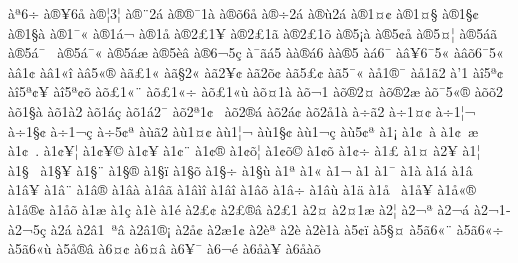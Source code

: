 {^^e0^^aa6^^ad^^f7
^^e0^^ae^^a56^^e5
^^e0^^ae^^a63^^a6
^^e0^^ae^^a82^^e1
^^e0^^ae^^ae^^af1^^e0
^^e0^^ae^^f56^^e5
^^e0^^ae^^f72^^e1
^^e0^^ae^^f92^^e1
^^e0^^ae1^^a4^^a2
^^e0^^ae1^^a4^^a7
^^e0^^ae1^^a7^^a2
^^e0^^ae1^^a7^^e0
^^e0^^ae1^^af^^ab
^^e0^^ae1^^e1^^ac
^^e0^^ae1^^e5
^^e0^^ae2^^a31^^ad^^a5
^^e0^^ae2^^a31^^ad^^e3
^^e0^^ae2^^a31^^ad^^f5
^^e0^^ae5^^a1^^e0
^^e0^^ae5^^a2^^e5
^^e0^^ae5^^a4^^a6
^^e0^^ae5^^e1^^ad^^e3
^^e0^^ae5^^e1^^af^^a0
^^e0^^ae5^^e1^^af^^ab
^^e0^^ae5^^e1^^e6
^^e0^^ae5^^e8^^e2
^^e0^^ae6^^ac5^^e7
^^e0^^af^^e3^^e15
^^e0^^e0^^ae^^e16
^^e0^^e0^^ae5
^^e0^^e16^^af
^^e0^^e2^^a56^^af5^^ab
^^e0^^e2^^f56^^af5^^ab
^^e0^^e21^^a2
^^e0^^e21^^ab^^ee
^^e0^^e25^^ab^^ae
^^e0^^e3^^a31^^ab
^^e0^^e3^^a72^^ab
^^e0^^e32^^a5^^a2
^^e0^^e32^^f5^^a2
^^e0^^e35^^a3^^a2
^^e0^^e35^^af^^ab
^^e0^^e51^^ae^^af
^^e0^^e51^^e32
^^e0'1
^^e0^^ee5^^aa^^a2^^a0
^^e0^^ee5^^aa^^a2^^a5
^^e0^^ee5^^aa^^a2^^f5
^^e0^^f5^^a31^^ab^^a8
^^e0^^f5^^a31^^ab^^f7
^^e0^^f5^^a31^^ab^^f9
^^e0^^f5^^a41^^e0
^^e0^^f5^^ac1^^ad
^^e0^^f5^^ae2^^a4
^^e0^^f5^^ae2^^e6
^^e0^^f5^^af5^^ab^^ae
^^e0^^f5^^f52
^^e0^^f51^^a7^^e0
^^e0^^f51^^e02
^^e0^^f51^^e1^^e7
^^e0^^f51^^e12^^af
^^e0^^f52^^aa1^^a2^^a0
^^e0^^f52^^ae^^e1
^^e0^^f52^^e1^^a2
^^e0^^f52^^e51^^e0
^^e0^^f7^^e32
^^e0^^f71^^a4^^a2
^^e0^^f71^^a6^^ac
^^e0^^f71^^a7^^a2
^^e0^^f71^^ac^^e7
^^e0^^f75^^a2^^aa
^^e0^^f9^^e32
^^e0^^f91^^a4^^a2
^^e0^^f91^^a6^^ac
^^e0^^f91^^a7^^a2
^^e0^^f91^^ac^^e7
^^e0^^f95^^a2^^aa
^^e01^^a1
^^e01^^a2^^a0^^e0
^^e01^^a2^^a0^^e6
^^e01^^a2^^a0.
^^e01^^a2^^a5^^a6
^^e01^^a2^^a5^^a9
^^e01^^a2^^a5^^ad
^^e01^^a2^^a8
^^e01^^a2^^ae
^^e01^^a2^^f5^^a6
^^e01^^a2^^f5^^a9
^^e01^^a2^^f5^^ad
^^e01^^a2^^f7
^^e01^^a3
^^e01^^a4
^^e02^^a5
^^e01^^a6
^^e01^^a7^^a0
^^e01^^a7^^a5
^^e01^^a7^^a8
^^e01^^a7^^ae
^^e01^^a7^^ef
^^e01^^a7^^f5
^^e01^^a7^^f7
^^e01^^a7^^f9
^^e01^^aa
^^e01^^ab
^^e01^^ac
^^e01^^ad
^^e01^^af
^^e01^^e0
^^e01^^e1
^^e01^^e2^^a0
^^e01^^e2^^a5
^^e01^^e2^^a8
^^e01^^e2^^ae
^^e01^^e2^^e0
^^e01^^e2^^e3
^^e01^^e2^^ec^^ee
^^e01^^e2^^ee
^^e01^^e2^^f5
^^e01^^e2^^f7
^^e01^^e2^^f9
^^e01^^e4
^^e01^^e5^^a0
^^e01^^e5^^a5
^^e01^^e5^^ab^^ae
^^e01^^e5^^ae^^a2
^^e01^^e5^^f5
^^e01^^e6
^^e01^^e7
^^e01^^e8
^^e01^^e9
^^e02^^a3^^a2
^^e02^^a3^^ae^^e2
^^e02^^a31^^ad
^^e02^^a4^^ad
^^e02^^a41^^e6
^^e02^^a6^^ad
^^e02^^ac^^aa
^^e02^^ac^^e1
^^e02^^ac1^^ad
^^e02^^ac5^^e7
^^e02^^e1^^ad
^^e02^^e21^^a0^^aa^^e2
^^e02^^e21^^ae^^a1
^^e02^^e5^^a2
^^e02^^e61^^a2
^^e02^^e8^^aa
^^e02^^e8^^ad
^^e02^^e81^^e0
^^e05^^a2^^ef
^^e05^^a7^^a4
^^e05^^e36^^ab^^a8
^^e05^^e36^^ab^^f7
^^e05^^e36^^ab^^f9
^^e05^^e5^^ae^^e2
^^e06^^a4^^a2
^^e06^^a4^^e2
^^e06^^a5^^af
^^e06^^ac^^e9
^^e06^^e5^^e0^^a5
^^e06^^e5^^e0^^f5
}
